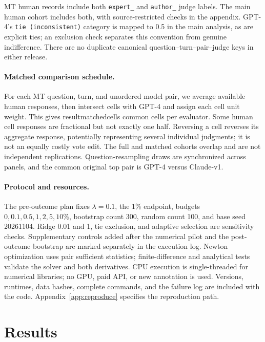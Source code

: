 \documentclass{article}
\newcommand{\R}[1]{\csname result#1\endcsname}
\begin{document}
MT human records include both \texttt{expert\_} and \texttt{author\_} judge labels. The main human cohort includes both, with source-restricted checks in the appendix. GPT-4's \texttt{tie (inconsistent)} category is mapped to 0.5 in the main analysis, as are explicit ties; an exclusion check separates this convention from genuine indifference. There are no duplicate canonical question--turn--pair--judge keys in either release.

\paragraph{Matched comparison schedule.}
For each MT question, turn, and unordered model pair, we average available human responses, then intersect cells with GPT-4 and assign each cell unit weight. This gives \R{matchedcells} common cells per evaluator. Some human cell responses are fractional but not exactly one half. Reversing a cell reverses its aggregate response, potentially representing several individual judgments; it is not an equally costly vote edit. The full and matched cohorts overlap and are not independent replications. Question-resampling draws are synchronized across panels, and the common original top pair is GPT-4 versus Claude-v1.

\paragraph{Protocol and resources.}
The pre-outcome plan fixes $\lambda=0.1$, the 1\% endpoint, budgets $0,0.1,0.5,1,2,5,10\%$, bootstrap count 300, random count 100, and base seed 20261104. Ridge 0.01 and 1, tie exclusion, and adaptive selection are sensitivity checks. Supplementary controls added after the numerical pilot and the post-outcome bootstrap are marked separately in the execution log. Newton optimization uses pair sufficient statistics; finite-difference and analytical tests validate the solver and both derivatives. CPU execution is single-threaded for numerical libraries; no GPU, paid API, or new annotation is used. Versions, runtimes, data hashes, complete commands, and the failure log are included with the code. Appendix~\ref{app:reproduce} specifies the reproduction path.

\section{Results}\label{sec:results}
\end{document}
